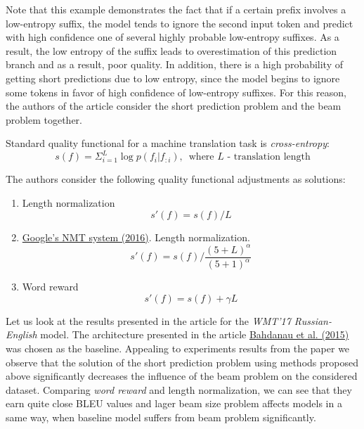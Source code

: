 \documentclass[a4paper,14pt]{extarticle}
\newcommand{\bibref}[3]{\hyperlink{#1}{#2 (#3)}}
\begin{document}
	Note that this example demonstrates the fact that if a certain prefix involves a low-entropy suffix, the model tends to ignore the second input token and predict with high confidence one of several highly probable low-entropy suffixes. As a result, the low entropy of the suffix leads to overestimation of this prediction branch and as a result, poor quality. In addition, there is a high probability of getting short predictions due to low entropy, since the model begins to ignore some tokens in favor of high confidence of low-entropy suffixes. For this reason, the authors of the article consider the short prediction problem and the beam problem together.
	
	Standard quality functional for a machine translation task is \textit{cross-entropy}:
	\begin{equation}
		s(f) = \Sigma_{i=1}^{L}\log p(f_i | f_{:i}), \,\,\, \text{where $L$ - translation length}
	\end{equation}
	
	The authors consider the following quality functional adjustments as solutions:
	\begin{enumerate}
		\item Length normalization
		\begin{equation}
			s'(f) = s(f) / L
		\end{equation}
		
		\item \bibref{gnmt}{Google's NMT system}{2016}. Length normalization. 
		\begin{equation}
			s'(f) = s(f) \Big/ \frac{(5 + L) ^ \alpha}{(5 + 1) ^ \alpha}
		\end{equation}
		
		\item Word reward
		\begin{equation}
			s'(f) = s(f) + \gamma L
		\end{equation}
	\end{enumerate}
	
	Let us look at the results presented in the article for the \textit{WMT'17 Russian-English} model. The architecture presented in the article \bibref{encdec_att}{Bahdanau et al.}{2015} was chosen as the baseline. Appealing to experiments results from the paper we observe that the solution of the short prediction problem using methods proposed above significantly decreases the influence of the beam problem on the considered dataset. Comparing \textit{word reward} and {length normalization}, we can see that they earn quite close BLEU values and lager beam size problem affects models in a same way, when baseline model suffers from beam problem significantly.
	
\end{document}
